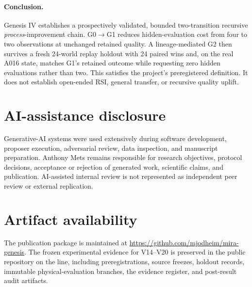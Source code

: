 \paragraph{Conclusion.}
Genesis IV establishes a prospectively validated, bounded two-transition recursive \emph{process}-improvement chain. G0$\rightarrow$G1 reduces hidden-evaluation cost from four to two observations at unchanged retained quality. A lineage-mediated G2 then survives a fresh 24-world replay holdout with 24 paired wins and, on the real A016 state, matches G1's retained outcome while requesting zero hidden evaluations rather than two. This satisfies the project's preregistered \lthreep definition. It does not establish open-ended RSI, general transfer, or recursive quality uplift.

\section*{AI-assistance disclosure}

Generative-AI systems were used extensively during software development, proposer execution, adversarial review, data inspection, and manuscript preparation. Anthony Mets remains responsible for research objectives, protocol decisions, acceptance or rejection of generated work, scientific claims, and publication. AI-assisted internal review is not represented as independent peer review or external replication.

\section*{Artifact availability}

The publication package is maintained at \url{https://github.com/mjodheim/mira-genesis}. The frozen experimental evidence for V14--V20 is preserved in the public  repository on the  line, including preregistrations, source freezes, holdout records, immutable physical-evaluation branches, the evidence register, and post-result audit artifacts.
